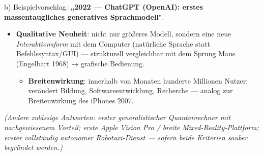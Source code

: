 \documentclass[11pt, a4paper]{article}
\begin{document}
b) Beispielvorschlag: \textbf{„2022 — ChatGPT (OpenAI): erstes massentaugliches generatives Sprachmodell"}.

\begin{itemize}
  \item \textbf{Qualitative Neuheit}: nicht nur größeres Modell, sondern eine neue \textit{Interaktionsform} mit dem Computer (natürliche Sprache statt Befehlssyntax/GUI) — strukturell vergleichbar mit dem Sprung Maus (Engelbart 1968) → grafische Bedienung.
\begin{itemize}
  \item \textbf{Breitenwirkung}: innerhalb von Monaten hunderte Millionen Nutzer; verändert Bildung, Softwareentwicklung, Recherche — analog zur Breitenwirkung des iPhones 2007.
\end{itemize}
\end{itemize}
\textit{(Andere zulässige Antworten: erster generalistischer Quantenrechner mit nachgewiesenem Vorteil; erste Apple Vision Pro / breite Mixed-Reality-Plattform; erster vollständig autonomer Robotaxi-Dienst — sofern beide Kriterien sauber begründet werden.)}





\end{document}
